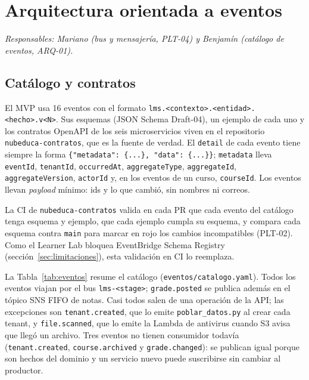 \section{Arquitectura orientada a eventos}
\label{sec:eventos}
\textit{Responsables: Mariano (bus y mensajería, PLT-04) y Benjamín (catálogo de eventos, ARQ-01).}

\subsection{Catálogo y contratos}
El MVP usa 16 eventos con el formato \texttt{lms.<contexto>.<entidad>.<hecho>.v<N>}. Sus esquemas
(JSON Schema Draft-04), un ejemplo de cada uno y los contratos OpenAPI de los seis microservicios viven
en el repositorio \texttt{nubeduca-contratos}, que es la fuente de verdad. El \texttt{detail} de cada
evento tiene siempre la forma \texttt{\{"metadata": \{...\}, "data": \{...\}\}}; \texttt{metadata}
lleva \texttt{eventId}, \texttt{tenantId}, \texttt{occurredAt}, \texttt{aggregateType},
\texttt{aggregateId}, \texttt{aggregateVersion}, \texttt{actorId} y, en los eventos de un curso,
\texttt{courseId}. Los eventos llevan \textit{payload} mínimo: ids y lo que cambió, sin nombres ni
correos.

La CI de \texttt{nubeduca-contratos} valida en cada PR que cada evento del catálogo tenga esquema y
ejemplo, que cada ejemplo cumpla su esquema, y compara cada esquema contra \texttt{main} para marcar en
rojo los cambios incompatibles (PLT-02). Como el Learner Lab bloquea EventBridge Schema Registry
(sección~\ref{sec:limitaciones}), esta validación en CI lo reemplaza.

La Tabla~\ref{tab:eventos} resume el catálogo (\texttt{eventos/catalogo.yaml}). Todos los eventos
viajan por el bus \texttt{lms-<stage>}; \texttt{grade.posted} se publica además en el tópico SNS FIFO de
notas. Casi todos salen de una operación de la API; las excepciones son \texttt{tenant.created}, que lo
emite \texttt{poblar\_datos.py} al crear cada tenant, y \texttt{file.scanned}, que lo emite la Lambda de
antivirus cuando S3 avisa que llegó un archivo. Tres eventos no tienen consumidor todavía
(\texttt{tenant.created}, \texttt{course.archived} y \texttt{grade.changed}): se publican igual porque
son hechos del dominio y un servicio nuevo puede suscribirse sin cambiar al productor.

